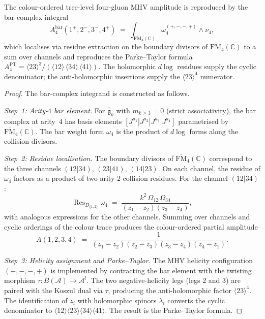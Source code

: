 \documentclass[11pt]{article}
\newcommand{\cA}{\mathcal{A}}
\newcommand{\fg}{\mathfrak{g}}
\newcommand{\barB}{\overline{B}}
\newcommand{\C}{\mathbb{C}}
\newcommand{\Res}{\operatorname{Res}}
\begin{document}
\begin{theorem}[MHV bar-complex integral at $n = 4$]
\label{thm:mhv-bar-integral-cel}
The colour-ordered tree-level four-gluon MHV amplitude is reproduced by
the bar-complex integral
\[
A_4^{\mathrm{bar}}(1^+, 2^-, 3^-, 4^+)
\;=\;
\int_{\overline{\mathrm{FM}}_4(\C)}
\omega_4^{(+,-,-,+)} \wedge \nu_4,
\]
which localises via residue extraction on the boundary divisors of
$\overline{\mathrm{FM}}_4(\C)$ to a sum over channels and reproduces
the Parke--Taylor formula
$A_4^{\mathrm{PT}} = \langle 23\rangle^3 /
(\langle 12\rangle\,\langle 34\rangle\,\langle 41\rangle)$.
The holomorphic $d\log$ residues supply the cyclic denominator; the
anti-holomorphic insertions supply the $\langle 23\rangle^4$ numerator.
\end{theorem}

\begin{proof}
The bar-complex integrand is constructed as follows.

\emph{Step~1: Arity-$4$ bar element.}
For $\widehat{\fg}_k$ with $m_{k \ge 3} = 0$ (strict associativity),
the bar complex at arity~$4$ has basis elements
$[J^{a_1}|J^{a_2}|J^{a_3}|J^{a_4}]$ parametrised by
$\overline{\mathrm{FM}}_4(\C)$.  The bar weight form $\omega_4$
is the product of $d\log$ forms along the collision divisors.

\emph{Step~2: Residue localisation.}
The boundary divisors of $\overline{\mathrm{FM}}_4(\C)$ correspond
to the three channels $(12|34)$, $(23|41)$, $(14|23)$.
On each channel, the residue of $\omega_4$ factors as a product of
two arity-$2$ collision residues.  For the channel $(12|34)$:
\[
\Res_{D_{\{1,2\}}} \omega_4
\;=\;
\frac{k^2\,\Omega_{12}\,\Omega_{34}}
{(z_1 - z_2)(z_3 - z_4)},
\]
with analogous expressions for the other channels.  Summing over
channels and cyclic orderings of the colour trace produces the
colour-ordered partial amplitude
\[
A(1,2,3,4)
\;=\;
\frac{1}{(z_1 - z_2)(z_2 - z_3)(z_3 - z_4)(z_4 - z_1)}.
\]

\emph{Step~3: Helicity assignment and Parke--Taylor.}
The MHV helicity configuration $(+,-,-,+)$ is implemented by
contracting the bar element with the twisting morphism
$\tau \colon \barB(\cA) \to \cA^!$.  The two negative-helicity
legs (legs $2$ and $3$) are paired with the Koszul dual via
$\tau$, producing the anti-holomorphic factor
$\langle 23 \rangle^4$.  The identification of $z_i$ with
holomorphic spinors $\lambda_i$ converts the cyclic denominator
to $\langle 12\rangle\langle 23\rangle\langle 34\rangle
\langle 41\rangle$.  The result is the Parke--Taylor formula.
\end{proof}
\end{document}
